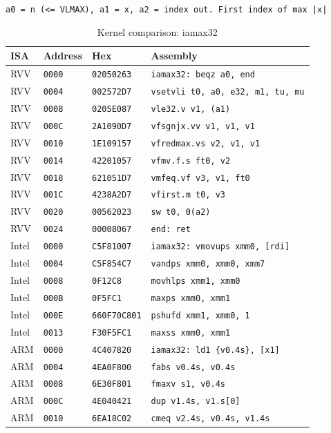 \begin{table}[htbp]
\centering
\caption{Kernel comparison: iamax32}
\begingroup
\scriptsize
\setlength{\tabcolsep}{4pt}
\noindent \texttt{a0 = n (<= VLMAX), a1 = x, a2 = index out. First index of max |x|}\par
\vspace{0.6ex}
\begin{tabular}{@{}l|l|l|p{7.2cm}@{}}
\toprule
ISA & Address & Hex & Assembly \\
\midrule
RVV & \texttt{0000} & \texttt{02050263} & \texttt{iamax32: beqz a0, end} \\
RVV & \texttt{0004} & \texttt{002572D7} & \texttt{vsetvli t0, a0, e32, m1, tu, mu} \\
RVV & \texttt{0008} & \texttt{0205E087} & \texttt{vle32.v v1, (a1)} \\
RVV & \texttt{000C} & \texttt{2A1090D7} & \texttt{vfsgnjx.vv v1, v1, v1} \\
RVV & \texttt{0010} & \texttt{1E109157} & \texttt{vfredmax.vs v2, v1, v1} \\
RVV & \texttt{0014} & \texttt{42201057} & \texttt{vfmv.f.s ft0, v2} \\
RVV & \texttt{0018} & \texttt{621051D7} & \texttt{vmfeq.vf v3, v1, ft0} \\
RVV & \texttt{001C} & \texttt{4238A2D7} & \texttt{vfirst.m t0, v3} \\
RVV & \texttt{0020} & \texttt{00562023} & \texttt{sw t0, 0(a2)} \\
RVV & \texttt{0024} & \texttt{00008067} & \texttt{end: ret} \\
\midrule
Intel & \texttt{0000} & \texttt{C5F81007} & \texttt{iamax32: vmovups xmm0, [rdi]} \\
Intel & \texttt{0004} & \texttt{C5F854C7} & \texttt{vandps xmm0, xmm0, xmm7} \\
Intel & \texttt{0008} & \texttt{0F12C8} & \texttt{movhlps xmm1, xmm0} \\
Intel & \texttt{000B} & \texttt{0F5FC1} & \texttt{maxps xmm0, xmm1} \\
Intel & \texttt{000E} & \texttt{660F70C801} & \texttt{pshufd xmm1, xmm0, 1} \\
Intel & \texttt{0013} & \texttt{F30F5FC1} & \texttt{maxss xmm0, xmm1} \\
\midrule
ARM & \texttt{0000} & \texttt{4C407820} & \texttt{iamax32: ld1 \{v0.4s\}, [x1]} \\
ARM & \texttt{0004} & \texttt{4EA0F800} & \texttt{fabs v0.4s, v0.4s} \\
ARM & \texttt{0008} & \texttt{6E30F801} & \texttt{fmaxv s1, v0.4s} \\
ARM & \texttt{000C} & \texttt{4E040421} & \texttt{dup v1.4s, v1.s[0]} \\
ARM & \texttt{0010} & \texttt{6EA18C02} & \texttt{cmeq v2.4s, v0.4s, v1.4s} \\
\bottomrule
\end{tabular}
\endgroup
\end{table}
\noindent{}\par
